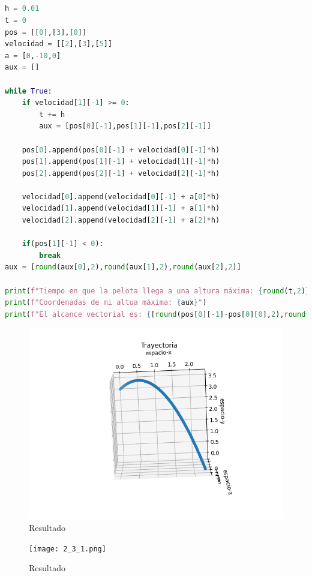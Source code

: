 \documentclass{article}
\begin{document}
\subsection{}
\begin{lstlisting}[language=Python,caption=Desafío 1.1]
h = 0.01
t = 0
pos = [[0],[3],[0]]
velocidad = [[2],[3],[5]]
a = [0,-10,0]
aux = []

while True:
    if velocidad[1][-1] >= 0:
        t += h
        aux = [pos[0][-1],pos[1][-1],pos[2][-1]]

    pos[0].append(pos[0][-1] + velocidad[0][-1]*h)
    pos[1].append(pos[1][-1] + velocidad[1][-1]*h)
    pos[2].append(pos[2][-1] + velocidad[2][-1]*h)

    velocidad[0].append(velocidad[0][-1] + a[0]*h)
    velocidad[1].append(velocidad[1][-1] + a[1]*h)
    velocidad[2].append(velocidad[2][-1] + a[2]*h)

    if(pos[1][-1] < 0):
        break
aux = [round(aux[0],2),round(aux[1],2),round(aux[2],2)]

print(f"Tiempo en que la pelota llega a una altura máxima: {round(t,2)}segundos")
print(f"Coordenadas de mi altua máxima: {aux}")
print(f"El alcance vectorial es: {[round(pos[0][-1]-pos[0][0],2),round(pos[1][-1]-pos[1][0],2),round(pos[2][-1]-pos[2][0],2)]}")

\end{lstlisting}
\begin{figure}[H]
    \centering
    \includegraphics[width=1.21\textwidth]{2_3.png}
    \caption{Resultado}
\end{figure}
\begin{figure}[H]
    \centering
    \texttt{[image: 2\_3\_1.png]}
    \caption{Resultado}
\end{figure}
\end{document}
